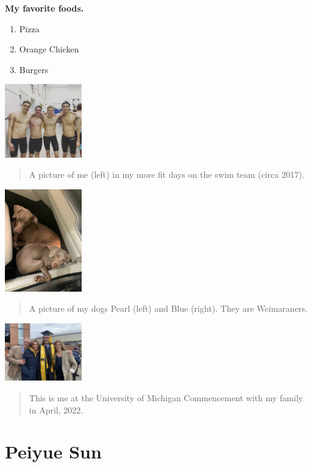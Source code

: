 \documentclass[
]{book}
\providecommand{\tightlist}{%
  \setlength{\itemsep}{0pt}\setlength{\parskip}{0pt}}
\begin{document}
\textbf{My favorite foods.}

\begin{enumerate}
\def\labelenumi{\arabic{enumi}.}
\tightlist
\item
  Pizza
\item
  Orange Chicken
\item
  Burgers
\end{enumerate}

\includegraphics[width=0.25\textwidth,height=\textheight]{swimmers.jpg}

\begin{quote}
A picture of me (left) in my more fit days on the swim team (circa 2017).
\end{quote}

\includegraphics[width=0.25\textwidth,height=\textheight]{dogs.jpeg}

\begin{quote}
A picture of my dogs Pearl (left) and Blue (right). They are Weimaraners.
\end{quote}

\includegraphics[width=0.25\textwidth,height=\textheight]{Graduation.jpg}

\begin{quote}
This is me at the University of Michigan Commencement with my family in April, 2022.
\end{quote}

\hypertarget{peiyue-sun}{%
\section{Peiyue Sun}\label{peiyue-sun}}
\end{document}
